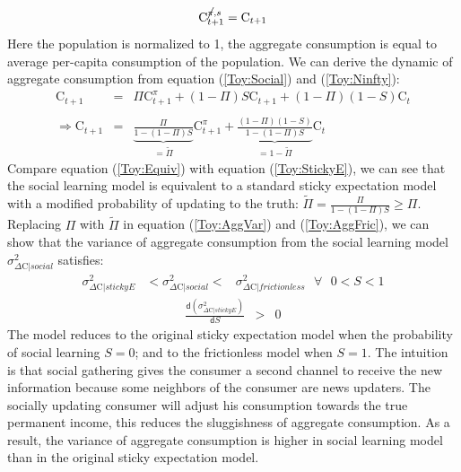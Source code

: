 \documentclass[12pt,letterpaper]{article}
\begin{document}
\begin{equation} \label{Toy:Ninfty}
\mathrm{C}_{t+1}^{\cancel{\pi},s}=\mathrm{C}_{t+1}
\end{equation}
Here the population is normalized to 1, the aggregate consumption is equal to average per-capita consumption of the population. We can derive the dynamic of aggregate consumption from equation (\ref{Toy:Social}) and (\ref{Toy:Ninfty}):
\begin{eqnarray} \label{Toy:Equiv}
\mathrm{C}_{t+1} & = & \Pi\mathrm{C}^{\pi}_{t+1}+\left(1-\Pi\right)S\mathrm{C}_{t+1}+\left(1-\Pi\right)\left(1-S\right)\mathrm{C}_{t} \nonumber\\ \nonumber
\\
\Rightarrow\mathrm{C}_{t+1} & = & \underbrace{\frac{\Pi}{1-\left(1-\Pi\right)S}}_{=\tilde{\Pi}}\mathrm{C}^{\pi}_{t+1}+\underbrace{\frac{\left(1-\Pi\right)\left(1-S\right)}{1-\left(1-\Pi\right)S}}_{=1-\tilde{\Pi}}\mathrm{C}_{t}
\end{eqnarray}
Compare equation (\ref{Toy:Equiv}) with equation (\ref{Toy:StickyE}), we can see that the social learning model is equivalent to a standard sticky expectation model with a modified probability of updating to the truth:  $\tilde{\Pi}=\frac{\Pi}{1-\left(1-\Pi\right)S}\geq\Pi$. Replacing $\Pi$ with $\tilde{\Pi}$ in equation (\ref{Toy:AggVar}) and (\ref{Toy:AggFric}), we can show that the variance of aggregate consumption from the social learning model $\sigma^{2}_{\Delta\mathrm{C}|social}$ satisfies:
\begin{eqnarray} \label{Toy:VarC}
\sigma^{2}_{\Delta\mathrm{C}|stickyE}&<\sigma^{2}_{\Delta\mathrm{C}|social}<&\sigma^{2}_{\Delta\mathrm{C}|frictionless}\text{  }\forall\text{  }0<S<1
\end{eqnarray}
\begin{eqnarray}
\frac{\mathsf{d}(\sigma^{2}_{\Delta\mathrm{C}|stickyE})}{\mathsf{d}S} & > & 0
\end{eqnarray}
The model reduces to the original sticky expectation model when the probability of social learning $S=0$; and to the frictionless model when $S=1$. The intuition is that social gathering gives the consumer a second channel to receive the new information because some neighbors of the consumer are news updaters. The socially updating consumer will adjust his consumption towards the true permanent income, this reduces the sluggishness of aggregate consumption. As a result, the variance of aggregate consumption is higher in social learning model than in the original sticky expectation model.
\end{document}
